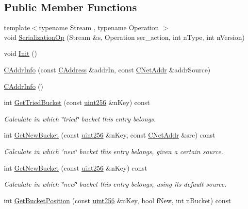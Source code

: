 \subsection*{Public Member Functions}
\begin{DoxyCompactItemize}
\item 
{\footnotesize template$<$typename Stream , typename Operation $>$ }\\void \hyperlink{class_c_addr_info_ae80fdec7d3b48278033ea2280f66e68b}{Serialization\+Op} (Stream \&s, Operation ser\+\_\+action, int n\+Type, int n\+Version)
\item 
void \hyperlink{class_c_addr_info_af1df1f12bc71ed7f3debae61058b9b9f}{Init} ()
\item 
\hyperlink{class_c_addr_info_a27e773233e8d7e7d183f138d24cc40ef}{C\+Addr\+Info} (const \hyperlink{class_c_address}{C\+Address} \&addr\+In, const \hyperlink{class_c_net_addr}{C\+Net\+Addr} \&addr\+Source)
\item 
\hyperlink{class_c_addr_info_ae14c3a91bb669e5580be1d3767264187}{C\+Addr\+Info} ()
\item 
int \hyperlink{class_c_addr_info_aa7fce3d285312f5673bdb5274724d6b8}{Get\+Tried\+Bucket} (const \hyperlink{classuint256}{uint256} \&n\+Key) const 
\begin{DoxyCompactList}\small\item\em Calculate in which \char`\"{}tried\char`\"{} bucket this entry belongs. \end{DoxyCompactList}\item 
int \hyperlink{class_c_addr_info_a433abfb3347fec32d615507ff6cd52b0}{Get\+New\+Bucket} (const \hyperlink{classuint256}{uint256} \&n\+Key, const \hyperlink{class_c_net_addr}{C\+Net\+Addr} \&src) const 
\begin{DoxyCompactList}\small\item\em Calculate in which \char`\"{}new\char`\"{} bucket this entry belongs, given a certain source. \end{DoxyCompactList}\item 
int \hyperlink{class_c_addr_info_aee08d115a3314aa8c960fbff960f62b2}{Get\+New\+Bucket} (const \hyperlink{classuint256}{uint256} \&n\+Key) const 
\begin{DoxyCompactList}\small\item\em Calculate in which \char`\"{}new\char`\"{} bucket this entry belongs, using its default source. \end{DoxyCompactList}\item 
int \hyperlink{class_c_addr_info_aff26ef9829651c2e6fa40aef88ab704d}{Get\+Bucket\+Position} (const \hyperlink{classuint256}{uint256} \&n\+Key, bool f\+New, int n\+Bucket) const 

\end{DoxyCompactItemize}
